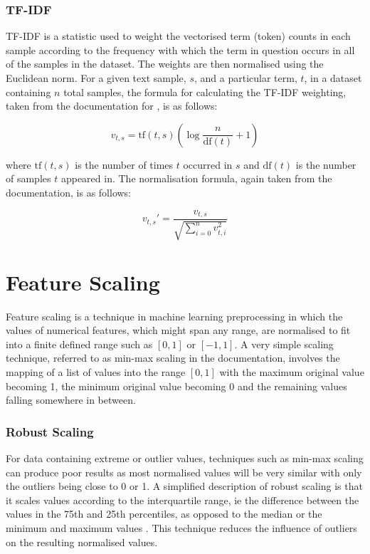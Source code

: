 \subsubsection{TF-IDF}

TF-IDF is a statistic used to weight the vectorised term (token) counts in each sample according to the frequency with which the term in question occurs in all of the samples in the dataset. The weights are then normalised using the Euclidean norm. For a given text sample, $s$, and a particular term, $t$, in a dataset containing $n$ total samples, the formula for calculating the TF-IDF weighting, taken from the documentation for \cite{pedregosa2011scikit}, is as follows:

\begin{equation*}
    v_{t,s} = \mathrm{tf}(t, s) \left( \log{\frac{n}{\mathrm{df}(t)}} + 1 \right)
\end{equation*}

where $\mathrm{tf}(t, s)$ is the number of times $t$ occurred in $s$ and $\mathrm{df}(t)$ is the number of samples $t$ appeared in. The normalisation formula, again taken from the documentation, is as follows:

\begin{equation*}
    v_{t,s}' = \frac{v_{t,s}}{\sqrt{\sum_{i=0}^n v_{t,i}^2}}
\end{equation*}

\section{Feature Scaling}

Feature scaling is a technique in machine learning preprocessing in which the values of numerical features, which might span any range, are normalised to fit into a finite defined range such as $[0,1]$ or $[-1,1]$. A very simple scaling technique, referred to as min-max scaling in the \cite{pedregosa2011scikit} documentation, involves the mapping of a list of values into the range $[0,1]$ with the maximum original value becoming 1, the minimum original value becoming 0 and the remaining values falling somewhere in between.

\subsubsection{Robust Scaling}

For data containing extreme or outlier values, techniques such as min-max scaling can produce poor results as most normalised values will be very similar with only the outliers being close to 0 or 1. A simplified description of robust scaling is that it scales values according to the interquartile range, ie the difference between the values in the 75th and 25th percentiles, as opposed to the median or the minimum and maximum values \cite{pedregosa2011scikit}. This technique reduces the influence of outliers on the resulting normalised values.

